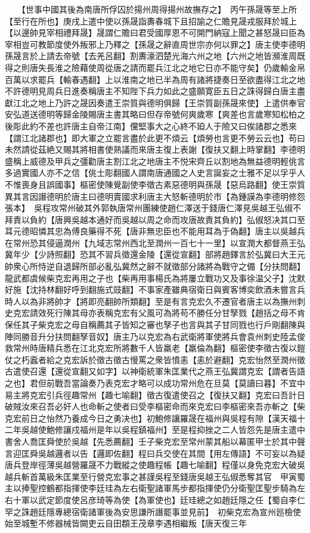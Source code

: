 　　【世事中國其後為南唐所俘囚於揚州周得揚州故撫存之】　丙午孫晟等至上所【至行在所也】庚戌上遣中使以孫晟詣夀春城下且招諭之仁贍見晟戎服拜於城上【以邊帥見宰相禮拜晟】晟謂仁贍曰君受國厚恩不可開門納寇上聞之甚怒晟曰臣為宰相豈可教節度使外叛邪上乃釋之【孫晟之辭直周世宗亦何以罪之】唐主使李德明孫晟言於上請去帝號【去羌呂翻】割夀濠泗楚光海六州之地【六州之地皆瀕淮周既得之則唐失長淮之險藉使周從唐之請而罷兵江北之地它日亦不能守矣】仍歲輸金帛百萬以求罷兵【輸春遇翻】上以淮南之地已半為周有諸將捷奏日至欲盡得江北之地不許德明見周兵日進奏稱唐主不知陛下兵力如此之盛願寛臣五日之誅得歸白唐主盡獻江北之地上乃許之晟因奏遣王崇質與德明俱歸【王崇質副孫晟來使】上遣供奉官安弘道送德明等歸金陵賜唐主書其略曰但存帝號何爽歲寒【爽差也言歲寒知松柏之後彫此約不差也許唐主自帝江南】儻堅事大之心終不廹人于險又曰俟諸郡之悉來【謂江北諸郡也】即大軍之立罷言盡於此更不煩云【煩勞也言更不勞云云也】苟曰未然請從茲絶又賜其將相書使熟議而來唐主復上表謝【復扶又翻上時掌翻】李德明盛稱上威德及甲兵之彊勸唐主割江北之地唐主不悦宋齊丘以割地為無益德明輕佻言多過實國人亦不之信【佻士彫翻國人謂南唐通國之人史言誕妄之士雅不足以孚乎人不惟喪身且誤國事】樞密使陳覺副使李徵古素惡德明與孫晟【惡烏路翻】使王崇質異其言因譖德明於唐主曰德明賣國求利唐主大怒斬德明於市【為鍾謨為李德明修怨張本】　吳程攻常州破其外郭執唐常州團練使趙仁澤送于錢唐仁澤見吳越王弘俶不拜責以負約【唐興吳越本通好而吳越以周之命而攻唐故責其負約】弘俶怒决其口至耳元德昭憐其忠為傅良藥得不死【唐非無忠臣也不能用耳為于偽翻】唐主以吳越兵在常州恐其侵逼潤州【九域志常州西北至潤州一百七十一里】以宣潤大都督燕王弘冀年少【少詩照翻】恐其不習兵徵還金陵【還從宣翻】部將趙鐸言於弘冀曰大王元帥衆心所恃逆自退歸所部必亂弘冀然之辭不就徵部分諸將為戰守之備【分扶問翻】龍武都虞候柴克宏再用之子也【柴再用事楊氏為將屢立戰功又及事徐温父子】沈默好施【沈持林翻好呼到翻施式豉翻】不事家產雖典宿衛日與賓客博奕飲酒未嘗言兵時人以為非將帥才【將即亮翻帥所類翻】至是有言克宏久不遷官者唐主以為撫州刺史克宏請效死行陳其母亦表稱克宏有父風可為將苟不勝任分甘孥戮【趙括之母不肯保任其子柴克宏之母自稱薦其子皆知之審也孥子也言與其子甘同戮也行戶剛翻陳與陣同勝音升分扶問翻孥音奴】唐主乃以克宏為右武衛將軍使將兵會袁州刺史陸孟俊救常州時唐精兵悉在江北克宏所將數千人皆羸老【羸倫為翻】樞密使李徵古復以鎧仗之朽蠧者給之克宏訴於徵古徵古慢罵之衆皆憤恚【恚於避翻】克宏怡然至潤州徵古遣使召還【還從宣翻又如字】以神衛統軍朱匡業代之燕王弘冀謂克宏【謂者告語之也】君但前戰吾當論奏乃表克宏才略可以成功常州危在旦莫【莫讀曰暮】不宜中易主將克宏引兵徑趣常州【趣七喻翻】徵古復遣使召之【復扶又翻】克宏曰吾計日破賊汝來召吾必奸人也命斬之使者曰受李樞密命而來克宏曰李樞密來吾亦斬之【柴克宏前日之怡然乃養成今日之勇决也】初鮑修讓羅晟在福州與吳程有隙【漢天福十二年吳越使鮑修讓戍福州是年以吳程鎮福州】至是程抑挫之二人皆怨先是唐主遣中書舍人喬匡舜使於吳越【先悉薦翻】壬子柴克宏至常州蒙其船以幕匿甲士於其中聲言迎匡舜吳越邏者以告【邏即佐翻】程曰兵交使在其間【用左傳語】不可妄以為疑唐兵登岸徑薄吳越營羅晟不力戰縱之使趣程帳【趣七喻翻】程僅以身免克宏大破吳越兵斬首萬級朱匡業至行營克宏事之甚謹吳程至錢唐吳越王弘俶悉奪其官　甲寅蜀主以捧聖控鶴都指揮使李廷珪為左右衛聖諸軍馬步都指揮使仍分衛聖匡聖步騎為左右十軍以武定節度使呂彦琦等為使【為軍使也】廷珪總之如趙廷隱之任【蜀自李仁罕之誅趙廷隱專總宿衛諸軍後為安思謙所譖罷事並見前】　初柴克宏為宣州廵檢使始至城塹不修器械皆闕吏云自田頵王茂章李遇相繼叛【唐天復三年